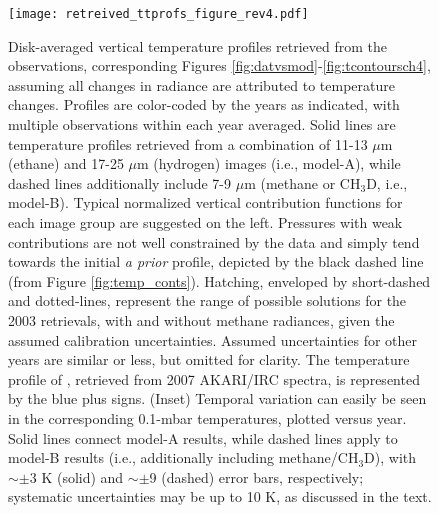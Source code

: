 \documentclass[twocolumn,10pt]{aastex631}
\begin{document}
\begin{figure}[h]
    \centering
    \texttt{[image: retreived\_ttprofs\_figure\_rev4.pdf]}
    \caption{Disk-averaged vertical temperature profiles retrieved from the observations, corresponding Figures \ref{fig:datvsmod}-\ref{fig:tcontoursch4}, assuming all changes in radiance are attributed to temperature changes. Profiles are color-coded by the years as indicated, with multiple observations within each year averaged. Solid lines are temperature profiles retrieved from a combination of 11-13 $\mu$m (ethane) and 17-25 $\mu$m (hydrogen) images (i.e., model-A), while dashed lines additionally include 7-9 $\mu$m (methane or CH$_3$D, i.e., model-B). Typical normalized vertical contribution functions for each image group are suggested on the left. Pressures with weak contributions are not well constrained by the data and simply tend towards the initial \textit{a prior} profile, depicted by the black dashed line (from Figure \ref{fig:temp_conts}).  Hatching, enveloped by short-dashed and dotted-lines, represent the range of possible solutions for the 2003 retrievals, with and without methane radiances, given the assumed calibration uncertainties. Assumed uncertainties for other years are similar or less, but omitted for clarity. The temperature profile of \citet{fletcher2014neptune}, retrieved from 2007 AKARI/IRC spectra, is represented by the blue plus signs. (Inset) Temporal variation can easily be seen in the corresponding  0.1-mbar temperatures, plotted versus year.  Solid lines connect model-A results, while dashed lines apply to model-B results (i.e., additionally including methane/CH$_3$D), with $\sim\pm$3 K (solid) and $\sim\pm$9  (dashed) error bars, respectively; systematic uncertainties may be up to 10 K, as discussed in the text.}
    \label{fig:trets} 
\end{figure}
\end{document}
